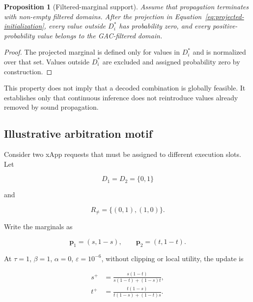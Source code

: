 \documentclass[pdflatex,sn-mathphys-num,iicol,oneside]{sn-jnl}
\newtheorem{proposition}{Proposition}
\begin{document}
\begin{proposition}[Filtered-marginal support]
Assume that propagation terminates with non-empty filtered domains.
After the projection in
Equation~\eqref{eq:projected-initialization}, every value outside
$D_i^{*}$ has probability zero, and every positive-probability value
belongs to the GAC-filtered domain.
\end{proposition}

\begin{proof}
The projected marginal is defined only for values in $D_i^{*}$ and is
normalized over that set. Values outside $D_i^{*}$ are excluded and
assigned probability zero by construction.
\end{proof}

This property does not imply that a decoded combination is globally
feasible. It establishes only that continuous inference does not
reintroduce values already removed by sound propagation.

\subsection{Illustrative arbitration motif}

Consider two xApp requests that must be assigned to different
execution slots. Let

\begin{equation}
D_1=D_2=\{0,1\}
\end{equation}

and

\begin{equation}
R_{\neq}
=
\{(0,1),(1,0)\}.
\end{equation}

Write the marginals as

\begin{equation}
\bm{p}_1=(s,1-s),
\qquad
\bm{p}_2=(t,1-t).
\end{equation}

At $\tau=1$, $\beta=1$, $\alpha=0$, $\varepsilon=10^{-6}$, without clipping or local
utility, the update is

\begin{align}
s^{+}
&=
\frac{s(1-t)}
{s(1-t)+(1-s)t},
\label{eq:s-update}\\
t^{+}
&=
\frac{t(1-s)}
{t(1-s)+(1-t)s}.
\label{eq:t-update}
\end{align}
\end{document}
